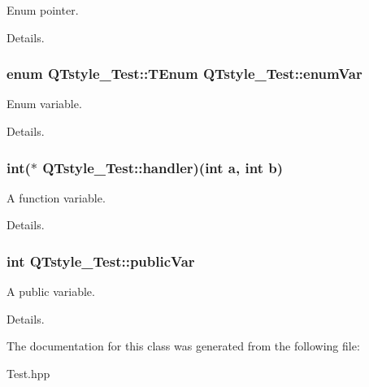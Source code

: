 Enum pointer. 

Details. \hypertarget{classQTstyle__Test_adb265d815b43f1f7f0de0e8b8852a5d0}{
\subsubsection[{enum\-Var}]{\setlength{\rightskip}{0pt plus 5cm}enum {\bf Q\-Tstyle\-\_\-\-Test\-::\-T\-Enum}
          Q\-Tstyle\-\_\-\-Test\-::enum\-Var}}\label{classQTstyle__Test_adb265d815b43f1f7f0de0e8b8852a5d0}


Enum variable. 

Details. \hypertarget{classQTstyle__Test_ac68d885776e89890c4732ae625c3f7fb}{
\subsubsection[{handler}]{\setlength{\rightskip}{0pt plus 5cm}int($\ast$ Q\-Tstyle\-\_\-\-Test\-::handler)(int a, int b)}}\label{classQTstyle__Test_ac68d885776e89890c4732ae625c3f7fb}


A function variable. 

Details. \hypertarget{classQTstyle__Test_aabf7b2e9ed83ea44aca4d213baae06d3}{
\subsubsection[{public\-Var}]{\setlength{\rightskip}{0pt plus 5cm}int Q\-Tstyle\-\_\-\-Test\-::public\-Var}}\label{classQTstyle__Test_aabf7b2e9ed83ea44aca4d213baae06d3}


A public variable. 

Details. 

The documentation for this class was generated from the following file\-:\begin{DoxyCompactItemize}
\item 
Test.\-hpp\end{DoxyCompactItemize}
